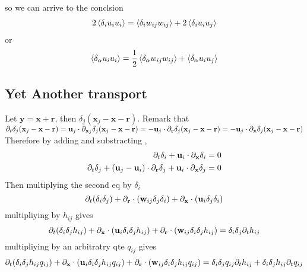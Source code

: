 so we can arrive to the conclsion 
\begin{align*}
    2\left<\delta_i u_iu_i\right> 
    =\left<\delta_i w_{ij}w_{ij}\right>
    + 2\left<\delta_i u_iu_j\right>
\end{align*}
or 
\begin{align}
    \left<\delta_\alpha u_iu_i\right>
    = \frac{1}{2}\left<\delta_\alpha w_{ij}w_{ij}\right>
    + \left<\delta_\alpha u_iu_j\right>
\end{align}

\subsection*{Yet Another transport}
Let $\textbf{y} = \textbf{x} + \textbf{r}$, then $\delta_j(\textbf{x}_j - \textbf{x}-\textbf{r})$. 
Remark that 
$\partial_t \delta_j(\textbf{x}_j - \textbf{x}-\textbf{r}) 
= \textbf{u}_j \cdot \partial_{\textbf{x}_j} \delta_j(\textbf{x}_j - \textbf{x}-\textbf{r})
= - \textbf{u}_j \cdot  \partial_{\textbf{r}}   \delta_j(\textbf{x}_j - \textbf{x}-\textbf{r})
= - \textbf{u}_j \cdot  \partial_{\textbf{x}}   \delta_j(\textbf{x}_j - \textbf{x}-\textbf{r})
$
Therefore by adding and substracting ,
\begin{align*}
    \partial_t \delta_i
    + \textbf{u}_i \cdot \partial_{\textbf{x}}    \delta_i
    &= 0 \\
    \partial_t \delta_j
    + (\textbf{u}_j - \textbf{u}_i) \cdot \partial_{\textbf{r}}    \delta_j 
    + \textbf{u}_i \cdot \partial_{\textbf{x}}    \delta_j 
    &= 0 
\end{align*}
Then multiplying the second eq by $\delta_i$ 
\begin{equation*}    
    \partial_t (\delta_i\delta_j)
    + \partial_{\textbf{r}} \cdot  (\textbf{w}_{ij} \delta_j \delta_i )
    +\partial_{\textbf{x}} \cdot (\textbf{u}_i\delta_j \delta_i )
\end{equation*}
multipliying by $h_{ij}$ gives
\begin{equation*}    
    \partial_t (\delta_i\delta_j h_{ij})
    +\partial_{\textbf{x}} \cdot (\textbf{u}_i\delta_i \delta_j h_{ij} )
    + \partial_{\textbf{r}} \cdot  (\textbf{w}_{ij} \delta_i \delta_j h_{ij} )
    = \delta_i\delta_j \partial_t h_{ij}
\end{equation*}
multipliying by an arbitratry qte $q_{ij}$ gives
\begin{equation*}    
    \partial_t (\delta_i\delta_j h_{ij}q_{ij})
    +\partial_{\textbf{x}} \cdot (\textbf{u}_i\delta_i \delta_j h_{ij}q_{ij} )
    + \partial_{\textbf{r}} \cdot  (\textbf{w}_{ij} \delta_i \delta_j h_{ij}q_{ij} )
    = 
    \delta_i\delta_j q_{ij}\partial_t h_{ij}
    + \delta_i\delta_j h_{ij}\partial_t q_{ij}
\end{equation*}
